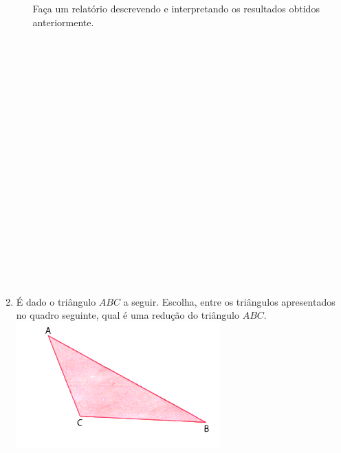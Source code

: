\documentclass[a4paper,14pt]{article}
\begin{document}
\begin{multicols}{2}
\begin{enumerate}
\begin{enumerate}[a)]
				\\\\ Faça um relatório descrevendo e interpretando os resultados obtidos anteriormente. \\\\\\\\\\\\\\\\\\\\\\\\\\\\\\\\\\\\\\\\
			\end{enumerate}
			\item É dado o triângulo $ABC$ a seguir. Escolha, entre os triângulos apresentados no quadro seguinte, qual é uma redução do triângulo $ABC$. \\
			\includegraphics[width=1\linewidth]{6FMA143_imagens/imagem4}
			\\

\end{enumerate}
\end{multicols}
\end{document}

